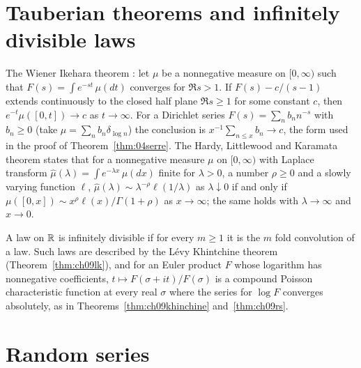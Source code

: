 \section{Tauberian theorems and infinitely divisible laws}

The Wiener Ikehara theorem \cite{wienerikehara1931,wiener1932}: let $\mu$ be a nonnegative measure on $[0,\infty)$ such that $F(s)=\int e^{-st}\,\mu(dt)$ converges for $\Re s>1$. If $F(s)-c/(s-1)$ extends continuously to the closed half plane $\Re s\ge1$ for some constant $c$, then $e^{-t}\mu([0,t])\to c$ as $t\to\infty$. For a Dirichlet series $F(s)=\sum_nb_nn^{-s}$ with $b_n\ge0$ (take $\mu=\sum_nb_n\delta_{\log n}$) the conclusion is $x^{-1}\sum_{n\le x}b_n\to c$, the form used in the proof of Theorem~\ref{thm:04serre}. The Hardy, Littlewood and Karamata theorem \cite{karamata1931,binghamgoldieteugels1987} states that for a nonnegative measure $\mu$ on $[0,\infty)$ with Laplace transform $\hat\mu(\lambda)=\int e^{-\lambda x}\,\mu(dx)$ finite for $\lambda>0$, a number $\rho\ge0$ and a slowly varying function $\ell$, $\hat\mu(\lambda)\sim\lambda^{-\rho}\ell(1/\lambda)$ as $\lambda\downarrow0$ if and only if $\mu([0,x])\sim x^\rho\ell(x)/\Gamma(1+\rho)$ as $x\to\infty$; the same holds with $\lambda\to\infty$ and $x\to0$.

A law on $\mathbb{R}$ is infinitely divisible if for every $m\ge1$ it is the $m$ fold convolution of a law. Such laws are described by the L\'evy Khintchine theorem \cite{sato1999} (Theorem~\ref{thm:ch09lk}), and for an Euler product $F$ whose logarithm has nonnegative coefficients, $t\mapsto F(\sigma+it)/F(\sigma)$ is a compound Poisson characteristic function at every real $\sigma$ where the series for $\log F$ converges absolutely, as in Theorems~\ref{thm:ch09khinchine} and~\ref{thm:ch09rs}.

\section{Random series}

